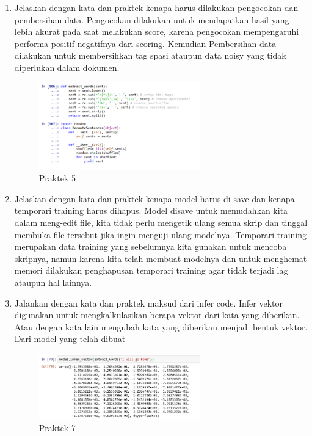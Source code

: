 \begin{enumerate}
	\item Jelaskan dengan kata dan praktek kenapa harus dilakukan pengocokan dan pembersihan data.
	\hfill\break
	Pengocokan dilakukan untuk mendapatkan hasil yang lebih akurat pada saat melakukan score, karena pengocokan mempengaruhi performa positif negatifnya dari scoring. Kemudian Pembersihan data dilakukan untuk membersihkan tag spasi ataupun data noisy yang tidak diperlukan dalam dokumen. 
		\begin{figure}[H]
			\includegraphics[width=7cm]{figures/1174077/5/p2r.png}
			\centering
			\caption{Praktek 5}
		\end{figure}
	\item Jelaskan dengan kata dan praktek kenapa model harus di save dan kenapa temporari training harus dihapus.
	\hfill\break
	Model disave untuk memudahkan kita dalam meng-edit ﬁle, kita tidak perlu mengetik ulang semua skrip dan tinggal membuka ﬁle tersebut jika ingin menguji ulang modelnya. Temporari training merupakan data training yang sebelumnya kita gunakan untuk mencoba skripnya, namun karena kita telah membuat modelnya dan untuk menghemat memori dilakukan penghapusan temporari training agar tidak terjadi lag ataupun hal lainnya.
		
			
	\item Jalankan dengan kata dan praktek maksud dari infer code.
	\hfill\break
	Infer vektor digunakan untuk mengkalkulasikan berapa vektor dari kata yang diberikan. Atau dengan kata lain mengubah kata yang diberikan menjadi bentuk vektor. Dari model yang telah dibuat 
		\begin{figure}[H]
			\includegraphics[width=7cm]{figures/1174077/5/p3r.png}
			\centering
			\caption{Praktek 7}
		\end{figure}


\end{enumerate}
